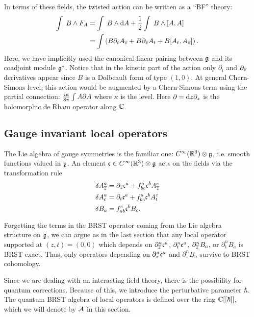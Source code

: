 \documentclass[11pt]{amsart}
\begin{document}
In terms of these fields, the twisted action can be written as a ``BF'' theory:
\begin{align*}
\int \; B \wedge F_A & = \int \; B \wedge {\rm d} A +  \frac12 \int \; B \wedge [A,A] \\
& = \int \left(B \partial_t A_{{\overline{z}}} + B \partial_{{\overline{z}}} A_t + B [A_t, A_{\overline{z}}]\right) .
\end{align*}
Here, we have implicitly used the canonical linear pairing between $\mathfrak g$ and its coadjoint module $\mathfrak g^*$. 
Notice that in the kinetic part of the action only $\partial_t$ and $\partial_{{\overline{z}}}$ derivatives appear since $B$ is a Dolbeault form of type $(1,0)$. At general Chern-Simons level, this action would be augmented by a Chern-Simons term using the partial connection: ${i \kappa \over 8 \pi} \int A \partial A$ where $\kappa$ is the level.
Here $\partial = {\rm d} z \partial_z$ is the holomorphic de Rham operator along $\mathbb C$. 

\subsection{Gauge invariant local operators}

The Lie algebra of gauge symmetries is the familiar one: $C^\infty(\mathbb R^3) \otimes \mathfrak g$, i.e. smooth functions valued in $\mathfrak g$. 
An element $\mathfrak c \in C^\infty(\mathbb R^3) \otimes \mathfrak g$ acts on the fields via the transformation rule
\begin{align*}
\delta A^a_{\overline{z}} & = \partial_{{\overline{z}}} \mathfrak c^a + f^a_{bc} \mathfrak c^b A^c_{\overline{z}} \\
\delta A^a_t & = \partial_t \mathfrak c^a + f^a_{bc} \mathfrak c^b A^c_t  \\
\delta B_a & = f^c_{ab} \mathfrak c^b B_c .
\end{align*}

Forgetting the terms in the BRST operator coming from the Lie algebra structure on $\mathfrak g$, we can argue as in the last section that any local operator supported at $(z,t) = (0,0)$ which depends on $\partial^n_{{\overline{z}}} \mathfrak c^a$, $\partial^n_t \mathfrak c^a$, $\partial^n_{{\overline{z}}} B_a$, or $\partial^n_t B_a$ is BRST exact. 
Thus, only operators depending on $\partial_z^n \mathfrak c^a$ and $\partial^n_z B_a$ survive to BRST cohomology.

Since we are dealing with an interacting field theory, there is the possibility for quantum corrections.  
Because of this, we introduce the perturbative parameter $\hbar$. 
The quantum BRST algebra of local operators is defined over the ring $\mathbb C[[\hbar]]$, which we will denote by $\mathcal A$ in this section. 
\end{document}

